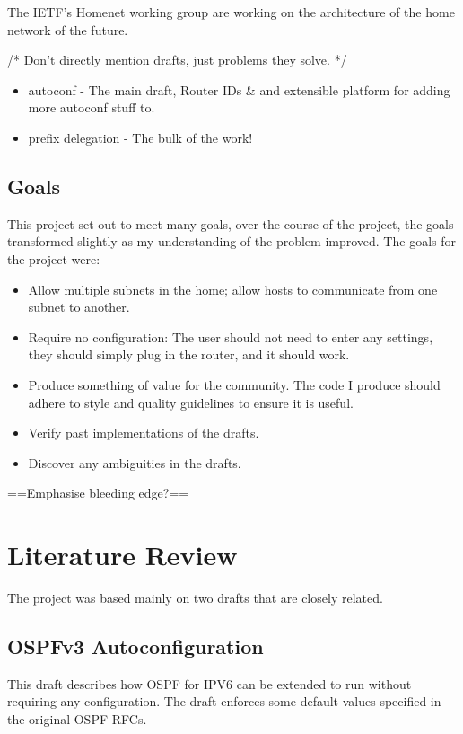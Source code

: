 \documentclass[12pt]{report}
\begin{document}
The IETF's Homenet working group are working on the architecture of the home
network of the future. 


/* Don't directly mention drafts, just problems they solve. */
\begin{itemize}
\item autoconf - The main draft, Router IDs \& and extensible platform for
  adding more autoconf stuff to.
\item prefix delegation - The bulk of the work!
\end{itemize}

\section{Goals}
This project set out to meet many goals, over the course of the project, the
goals transformed slightly as my understanding of the problem improved. The
goals for the project were:


\begin{itemize}
\item Allow multiple subnets in the home; allow hosts to communicate from one
  subnet to another.
\item Require no configuration: The user should not need to enter any settings,
  they should simply plug in the router, and it should work.
\item Produce something of value for the community. The code I produce should
  adhere to style and quality guidelines to ensure it is useful.
\item Verify past implementations of the drafts.
\item Discover any ambiguities in the drafts.
\end{itemize}

==Emphasise bleeding edge?==

\chapter{Literature Review} 

The project was based mainly on two drafts that are closely related.

\section{OSPFv3 Autoconfiguration}
This draft describes how OSPF for IPV6 can be extended to run without requiring
any configuration. The draft enforces some default values specified in the
original OSPF RFCs.
\end{document}
